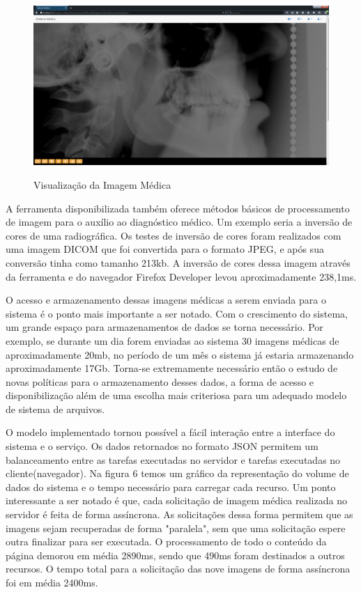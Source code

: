 \begin{figure}[ht]
	\centering	
	\caption[\hspace{0.1cm}Imagens Clínicas.]{Visualização da Imagem Médica}
	\vspace{-0.4cm}
	\includegraphics[width=.8\textwidth]{figuras/visualizacaoImagemMedicaGrandeResolucao.png}
	\vspace{-0.2cm}
	\label{fig:figura6}
\end{figure}

A ferramenta disponibilizada também oferece métodos básicos de processamento de imagem para o auxílio ao diagnóstico médico. Um exemplo seria a inversão de cores de uma radiográfica. Os testes de inversão de cores foram realizados com uma imagem DICOM que foi convertida para o formato JPEG, e após sua conversão tinha como  tamanho 213kb. A inversão de cores dessa imagem através da ferramenta e do navegador Firefox Developer levou aproximadamente 238,1ms. 

O acesso e armazenamento dessas imagens médicas a serem enviada para o sistema é o ponto mais importante a ser notado. Com o crescimento do sistema, um grande espaço para armazenamentos de dados se torna necessário. Por exemplo, se durante um dia forem enviadas ao sistema 30 imagens médicas de aproximadamente 20mb, no período de um mês o sistema já estaria armazenando aproximadamente 17Gb. Torna-se extremamente necessário então o estudo de novas políticas para o armazenamento desses dados, a forma de acesso e disponibilização além de uma escolha mais criteriosa para um adequado modelo de sistema de arquivos.

O modelo implementado tornou possível a fácil interação entre a interface do sistema e o serviço. Os dados retornados no formato JSON permitem um balanceamento entre as tarefas executadas no servidor e tarefas executadas no cliente(navegador). Na figura 6 temos um gráfico da representação do volume de dados do sistema e o tempo necessário para carregar cada recurso. Um ponto interessante a ser notado é que, cada solicitação de imagem médica realizada no servidor é feita de forma assíncrona. As solicitações dessa forma permitem que as imagens sejam recuperadas de forma "paralela", sem que uma solicitação espere outra finalizar para ser executada. O processamento de todo o conteúdo da página demorou em média 2890ms, sendo que 490ms foram destinados a outros recursos. O tempo total para a solicitação das nove imagens de forma assíncrona foi em média 2400ms.


